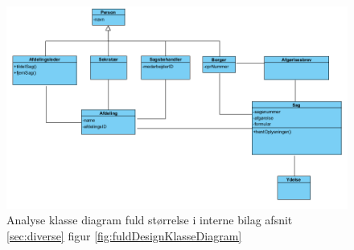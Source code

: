 \begin{figure}[h]
  \includegraphics[width=\linewidth]{./PNG/analyse/analyseKlasseDiagram.PNG} 
  \caption{Analyse klasse diagram fuld størrelse i interne bilag afsnit \ref{sec:diverse} figur \ref{fig:fuldDesignKlasseDiagram}}
  \label{fig:AKlasse}
\end{figure}

